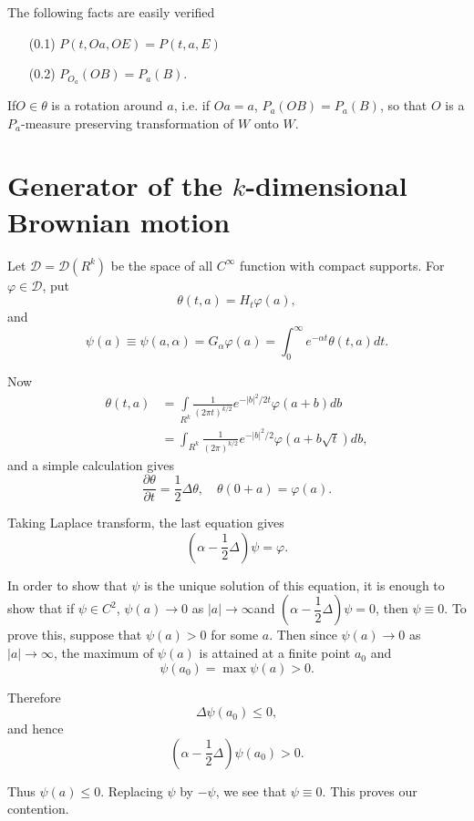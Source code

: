 The following facts are easily verified
\begin{itemize}
\item[(0.1)] $P (t,Oa, OE) = P (t, a, E)$
\item[(0.2)] $P_{O{_a}} (O B) = P_a (B)$.
\end{itemize}

If\pageoriginale $O \in \theta$ is a rotation around $a$, i.e.  if $Oa = a$,
$P_a (OB) = P_a(B)$, so that $O$ is a $P_a$-measure preserving
transformation of $W$ onto $W$. 

\section{Generator of the $k$-dimensional Brownian
  motion}\label{chap3-sec2}%

Let $\mathscr{D} = \mathscr{D} (R^k)$ be the space of all $C^\infty$
function with compact supports. For $\varphi \in \mathscr{D}$,
put 
$$
\theta (t, a) = H_t \varphi (a),
$$
and
$$ 
\psi (a) \equiv \psi (a, \alpha) = G_\alpha \varphi (a) = \int^\infty_0
  e^{-\alpha t} \theta (t, a)dt.
$$

Now
\begin{align*}
\theta(t,a) & =\int\limits_{R^k} \frac{1}{(2 \pi t)^{k/2}} e^{-|b|^2/2t}
  \varphi (a+b)db\\ 
  & = \int_{R^k} \frac{1}{(2 \pi)^{k/2}} e^{-|b|^2 /2} \varphi (a+b \sqrt{t})db, 
\end{align*} 
and a simple calculation gives
$$
\frac{\partial \theta}{\partial t} = \frac{1}{2} \Delta \theta,\quad
\theta (0+a) = \varphi (a). 
$$
 
Taking Laplace transform, the last equation gives
$$
(\alpha - \frac{1}{2} \Delta) \psi = \varphi.
$$
 
In order to show that $\psi$ is the unique solution of this equation,
it is enough to show that if $\psi \in C^2$, $\psi (a) \to 0$ as
$|a| \to \infty$\pageoriginale and $(\alpha - \dfrac{1}{2} \Delta)\psi
= 0$, then $\psi \equiv 0$. To prove this, suppose that $\psi (a) > 0$ for
some $a$. Then since $\psi (a) \to 0$ as $|a| \to \infty$, the maximum
of $\psi(a)$ is attained at a finite point $a_0$ and  
$$
\psi (a_0) = \max \psi(a) > 0.
$$

Therefore 
$$
\Delta \psi (a_0) \leq 0,
$$
and hence 
$$
(\alpha - \dfrac{1}{2}\Delta) \psi (a_0) > 0.
$$

Thus $\psi (a) \leq 0$. Replacing $\psi$ by $-\psi$, we see that $\psi
\equiv 0$. This proves our contention. 

